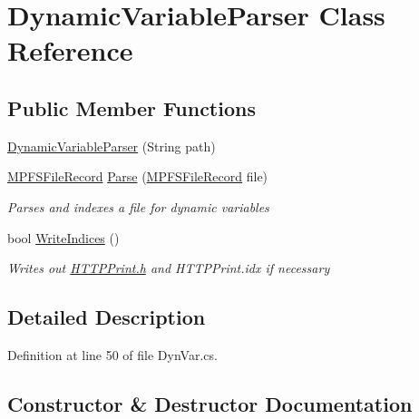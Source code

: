 \hypertarget{class_microchip_1_1_dynamic_variable_parser}{}\section{Dynamic\+Variable\+Parser Class Reference}
\label{class_microchip_1_1_dynamic_variable_parser}
\subsection*{Public Member Functions}
\begin{DoxyCompactItemize}
\item 
\hyperlink{class_microchip_1_1_dynamic_variable_parser_ac6220493692a3783054125aaed170bbf}{Dynamic\+Variable\+Parser} (String path)
\item 
\hyperlink{class_microchip_1_1_m_p_f_s_file_record}{M\+P\+F\+S\+File\+Record} \hyperlink{class_microchip_1_1_dynamic_variable_parser_a3d23b22cc96f9c9ac3ddbc417141f29a}{Parse} (\hyperlink{class_microchip_1_1_m_p_f_s_file_record}{M\+P\+F\+S\+File\+Record} file)
\begin{DoxyCompactList}\small\item\em Parses and indexes a file for dynamic variables \end{DoxyCompactList}\item 
bool \hyperlink{class_microchip_1_1_dynamic_variable_parser_a2da519fec10f8c28221a285848ca14a8}{Write\+Indices} ()
\begin{DoxyCompactList}\small\item\em Writes out \hyperlink{_h_t_t_p_print_8h}{H\+T\+T\+P\+Print.\+h} and H\+T\+T\+P\+Print.\+idx if necessary \end{DoxyCompactList}\end{DoxyCompactItemize}


\subsection{Detailed Description}


Definition at line 50 of file Dyn\+Var.\+cs.



\subsection{Constructor \& Destructor Documentation}
\hypertarget{class_microchip_1_1_dynamic_variable_parser_ac6220493692a3783054125aaed170bbf}{}
